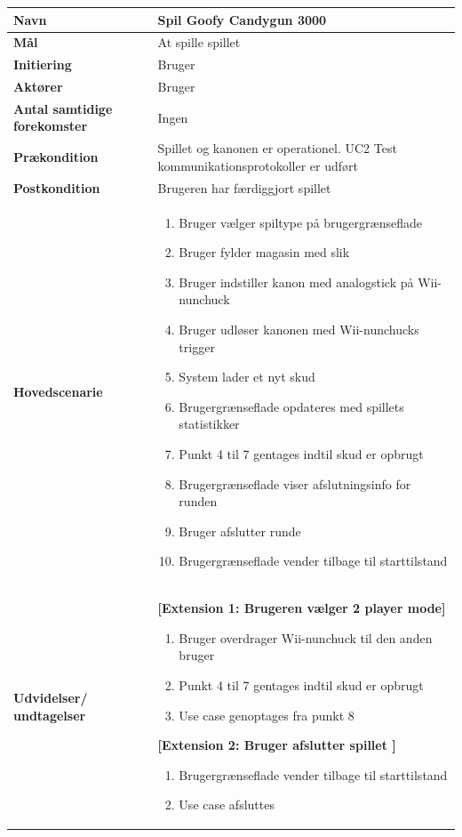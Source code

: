 \begin{tabular}{|>{\hspace{0pt}}p{3cm}  |>{\hspace{0pt}}p{9cm}|}
	\hline
	\textbf{Navn} & Spil Goofy Candygun 3000\\ \hline
	\textbf{Mål} & At spille spillet\\ \hline
	\textbf{Initiering} & Bruger\\ \hline
	\textbf{Aktører} & Bruger\\ \hline
	\textbf{Antal samtidige forekomster} & Ingen \\ \hline
	\textbf{Prækondition} & Spillet og kanonen er operationel. UC2 Test kommunikationsprotokoller er udført \\ \hline
	\textbf{Postkondition} &  Brugeren har færdiggjort spillet \\ \hline
	\textbf{Hovedscenarie} & \begin{enumerate}
		\item Bruger vælger spiltype på brugergrænseflade
		\item Bruger fylder magasin med slik
		\item Bruger indstiller kanon med analogstick på Wii-nunchuck
		\item Bruger udløser kanonen med Wii-nunchucks trigger
		\item System lader et nyt skud
		\item Brugergrænseflade opdateres med spillets statistikker
		\item Punkt 4 til 7 gentages indtil skud er opbrugt 
		\subitem [Extension 1: Bruger vælger 2 player mode] 
		\subitem[Extension 2: Bruger afslutter det igangværende spil]
		\item Brugergrænseflade viser afslutningsinfo for runden
		\item Bruger afslutter runde
		\item Brugergrænseflade vender tilbage til starttilstand
	\end{enumerate}\\ \hline
	\textbf{Udvidelser/ undtagelser} & \textbf{[Extension 1: Brugeren vælger 2 player mode]} \newline \begin{enumerate} 
		\item Bruger overdrager Wii-nunchuck til den anden bruger
		\item Punkt 4 til 7 gentages indtil skud er opbrugt
		\item Use case genoptages fra punkt 8
		\end{enumerate}
		\textbf{[Extension 2: Bruger afslutter spillet ]} \newline \begin{enumerate}
		\item Brugergrænseflade vender tilbage til starttilstand
		\item Use case afsluttes
		\end{enumerate}\\ \hline
\end{tabular}

